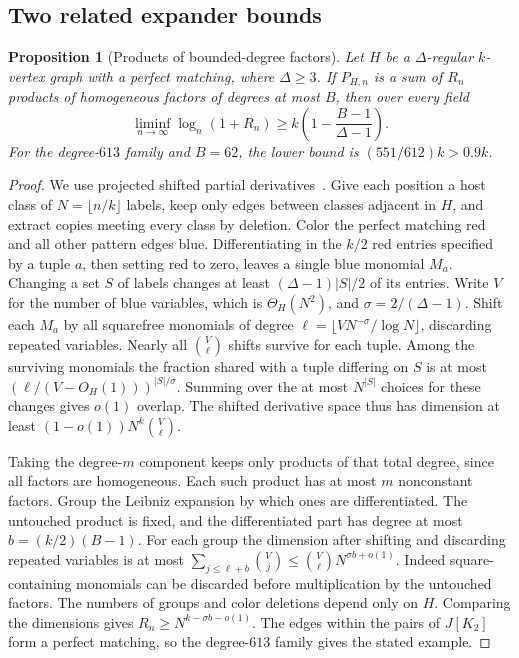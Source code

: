 \documentclass[11pt]{article}
\newtheorem{proposition}[theorem]{Proposition}
\theoremstyle{remark}
\begin{document}
\subsection{Two related expander bounds}
\begin{proposition}[Products of bounded-degree factors]\label{boundedfactors}
Let $H$ be a $\Delta$-regular $k$-vertex graph with a perfect matching, where $\Delta\ge3$. If $P_{H,n}$ is a sum of $R_n$ products of homogeneous factors of degrees at most $B$, then over every field
\[
 \liminf_{n\to\infty}\log_n(1+R_n)\ge k\left(1-\frac{B-1}{\Delta-1}\right).
\]
For the degree-$613$ family and $B=62$, the lower bound is $(551/612)k>0.9k$.
\end{proposition}
\begin{proof}
We use projected shifted partial derivatives~\cite{klss}. Give each position a host class of $N=\lfloor n/k\rfloor$ labels, keep only edges between classes adjacent in $H$, and extract copies meeting every class by deletion. Color the perfect matching red and all other pattern edges blue. Differentiating in the $k/2$ red entries specified by a tuple $a$, then setting red to zero, leaves a single blue monomial $M_a$. Changing a set $S$ of labels changes at least $(\Delta-1)|S|/2$ of its entries. Write $V$ for the number of blue variables, which is $\Theta_H(N^2)$, and $\sigma=2/(\Delta-1)$. Shift each $M_a$ by all squarefree monomials of degree $\ell=\lfloor V N^{-\sigma}/\log N\rfloor$, discarding repeated variables. Nearly all $\binom{V}{\ell}$ shifts survive for each tuple. Among the surviving monomials the fraction shared with a tuple differing on $S$ is at most $(\ell/(V-O_H(1)))^{|S|/\sigma}$. Summing over the at most $N^{|S|}$ choices for these changes gives $o(1)$ overlap. The shifted derivative space thus has dimension at least $(1-o(1))N^k\binom{V}{\ell}$.

Taking the degree-$m$ component keeps only products of that total degree, since all factors are homogeneous. Each such product has at most $m$ nonconstant factors. Group the Leibniz expansion by which ones are differentiated. The untouched product is fixed, and the differentiated part has degree at most $b=(k/2)(B-1)$. For each group the dimension after shifting and discarding repeated variables is at most $\sum_{j\le\ell+b}\binom Vj\le\binom V\ell N^{\sigma b+o(1)}$. Indeed square-containing monomials can be discarded before multiplication by the untouched factors. The numbers of groups and color deletions depend only on $H$. Comparing the dimensions gives $R_n\ge N^{k-\sigma b-o(1)}$. The edges within the pairs of $J[K_2]$ form a perfect matching, so the degree-$613$ family gives the stated example.
\end{proof}
\end{document}
